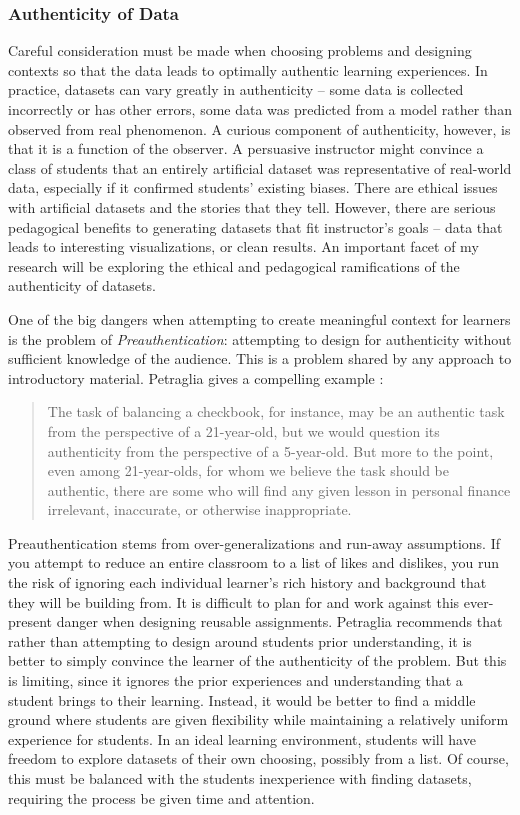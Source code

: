 \subsubsection{Authenticity of Data}

Careful consideration must be made when choosing problems and designing contexts so that the data leads to optimally authentic learning experiences.
In practice, datasets can vary greatly in authenticity -- some data is collected incorrectly or has other errors, some data was predicted from a model rather than observed from real phenomenon.
A curious component of authenticity, however, is that it is a function of the observer.
A persuasive instructor might convince a class of students that an entirely artificial dataset was representative of real-world data, especially if it confirmed students' existing biases.
There are ethical issues with artificial datasets and the stories that they tell.
However, there are serious pedagogical benefits to generating datasets that fit instructor's goals -- data that leads to interesting visualizations, or clean results.
An important facet of my research will be exploring the ethical and pedagogical ramifications of the authenticity of datasets.

One of the big dangers when attempting to create meaningful context for learners is the problem of \textit{Preauthentication}: attempting to design for authenticity without sufficient knowledge of the audience. This is a problem shared by any approach to introductory material. Petraglia gives a compelling example \cite{preauthentication}:
	
\begin{quotation}
    The task of balancing a checkbook, for instance, may be an authentic task from the perspective of a 21-year-old, but we would question its authenticity from the perspective of a 5-year-old. But more to the point, even among 21-year-olds, for whom we believe the task should be authentic, there are some who will find any given lesson in personal finance irrelevant, inaccurate, or otherwise inappropriate. 
\end{quotation}
Preauthentication stems from over-generalizations and run-away assumptions.
If you attempt to reduce an entire classroom to a list of likes and dislikes, you run the risk of ignoring each individual learner's rich history and background that they will be building from. 
It is difficult to plan for and work against this ever-present danger when designing reusable assignments. 
Petraglia \cite{preauthentication} recommends that rather than attempting to design around students prior understanding, it is better to simply convince the learner of the authenticity of the problem.
But this is limiting, since it ignores the prior experiences and understanding that a student brings to their learning.
Instead, it would be better to find a middle ground where students are given flexibility while maintaining a relatively uniform experience for students.
In an ideal learning environment, students will have freedom to explore datasets of their own choosing, possibly from a list.
Of course, this must be balanced with the students inexperience with finding datasets, requiring the process be given time and attention.
